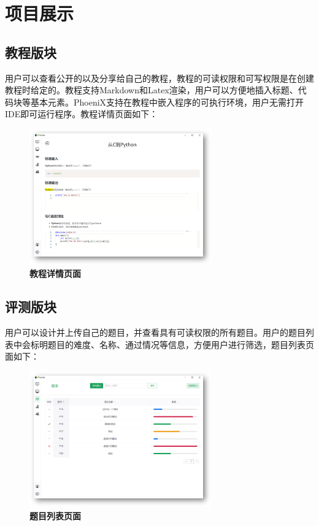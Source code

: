 \chapter{项目展示}

\section{教程版块}

用户可以查看公开的以及分享给自己的教程，教程的可读权限和可写权限是在创建教程时给定的。教程支持Markdown和Latex渲染，用户可以方便地插入标题、代码块等基本元素。PhoeniX支持在教程中嵌入程序的可执行环境，用户无需打开IDE即可运行程序。教程详情页面如下：

\begin{figure}[H]
    \centering
    \includegraphics[width=0.7\textwidth]{figure/tutorial1.png}
    \caption{\textbf{教程详情页面}}
    \label{fig:tutorial1}
\end{figure}

\section{评测版块}

用户可以设计并上传自己的题目，并查看具有可读权限的所有题目。用户的题目列表中会标明题目的难度、名称、通过情况等信息，方便用户进行筛选，题目列表页面如下：

\begin{figure}[H]
    \centering
    \includegraphics[width=0.7\textwidth]{figure/problem1.png}
    \caption{\textbf{题目列表页面}}
    \label{fig:problem1}
\end{figure}

